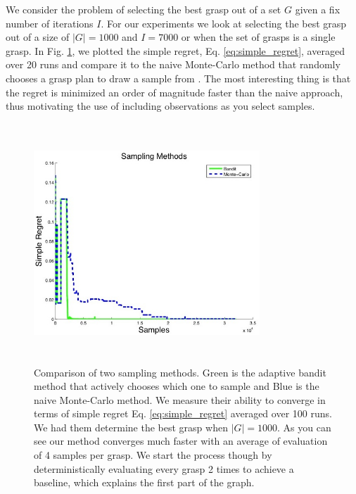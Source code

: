 \documentclass[letterpaper, 10 pt, conference]{ieeeconf}  %
\begin{document}
We consider the problem of selecting the best grasp out of a set $G$ given a fix number of iterations $I$. For our experiments we look at selecting the best grasp out of a size of $|G| = 1000$ and $I= 7000$ or when the set of grasps is a single grasp. In Fig. \ref{fig:simple_regret}, we plotted the simple regret, Eq. \ref{eq:simple_regret}, averaged over 20 runs and compare it to the naive Monte-Carlo method that randomly chooses a grasp plan to draw a sample from . The most interesting thing is that the regret is minimized an order of magnitude faster than the naive approach, thus motivating the use of including observations as you select samples. 


\begin{figure}[ht!]
\centering
\includegraphics[width=8.5cm,height=9cm]{figures/Slide09.jpg}
\caption{Comparison of two sampling methods. Green is the adaptive bandit method that actively chooses which one to sample and Blue is the naive Monte-Carlo method. We measure their ability to converge in terms of simple regret Eq. \ref{eq:simple_regret} averaged over 100 runs. We had them determine the best grasp when $|G|=1000$. As you can see our method converges much faster with an average of evaluation of 4 samples per grasp. We start the process though by deterministically evaluating every grasp 2 times to achieve a baseline, which explains the first part of the graph.}
\vspace*{-10pt}
\label{fig:simple_regret}
\end{figure}

\end{document}
